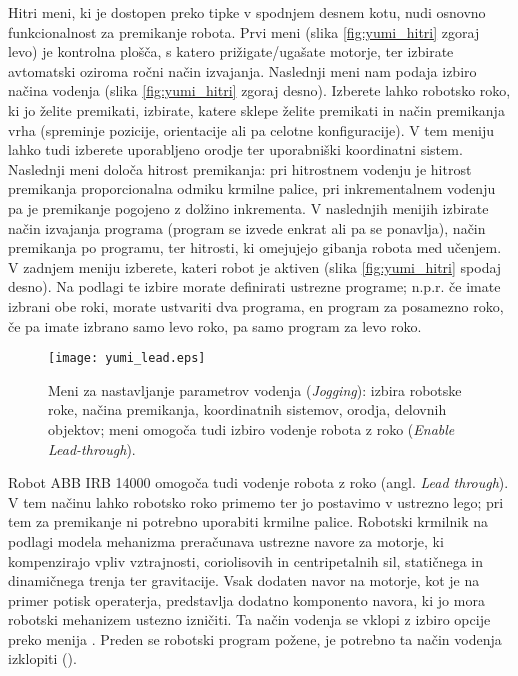 Hitri meni, ki je dostopen preko tipke v spodnjem desnem kotu, nudi osnovno funkcionalnost za premikanje robota. Prvi meni (slika \ref{fig:yumi_hitri} zgoraj levo) je kontrolna plošča, s katero prižigate/ugašate motorje, ter izbirate avtomatski oziroma ročni način izvajanja. Naslednji meni nam podaja izbiro načina vodenja (slika \ref{fig:yumi_hitri} zgoraj desno). Izberete lahko robotsko roko, ki jo želite premikati, izbirate, katere sklepe želite premikati in način premikanja vrha (spreminje pozicije, orientacije ali pa celotne konfiguracije). V tem meniju lahko tudi izberete uporabljeno orodje ter uporabniški koordinatni sistem. Naslednji meni določa hitrost premikanja: pri hitrostnem vodenju je hitrost premikanja proporcionalna odmiku krmilne palice, pri inkrementalnem vodenju pa je premikanje pogojeno z dolžino inkrementa. V naslednjih menijih izbirate način izvajanja programa (program se izvede enkrat ali pa se ponavlja), način premikanja po programu, ter hitrosti, ki omejujejo gibanja robota med učenjem. V zadnjem meniju izberete, kateri robot je aktiven (slika \ref{fig:yumi_hitri} spodaj desno). Na podlagi te izbire morate definirati ustrezne programe; n.p.r. če imate izbrani obe roki, morate ustvariti dva programa, en program za posamezno roko, če pa imate izbrano samo levo roko, pa samo program za levo roko.


\begin{figure}[!hbt]
	\centering
	\texttt{[image: yumi\_lead.eps]}
	\caption{Meni za nastavljanje parametrov vodenja (\emph{Jogging}): izbira robotske roke, načina premikanja, koordinatnih sistemov, orodja, delovnih objektov; meni omogoča tudi izbiro vodenje robota z roko (\emph{Enable Lead-through}).}
	\label{fig:yumi_smart_meni}
\end{figure}

Robot ABB IRB 14000 omogoča tudi vodenje robota z roko (angl. \emph{Lead through}). V tem načinu lahko robotsko roko primemo ter jo postavimo v ustrezno lego; pri tem za premikanje ni potrebno uporabiti krmilne palice. Robotski krmilnik na podlagi modela mehanizma preračunava ustrezne navore za motorje, ki kompenzirajo vpliv vztrajnosti, coriolisovih in centripetalnih sil, statičnega in dinamičnega trenja ter gravitacije. Vsak dodaten navor na motorje, kot je na primer potisk operaterja, predstavlja dodatno komponento navora, ki jo mora robotski mehanizem ustezno izničiti. Ta način vodenja se vklopi z izbiro opcije  preko menija . Preden se robotski program požene, je potrebno ta način vodenja izklopiti ().



